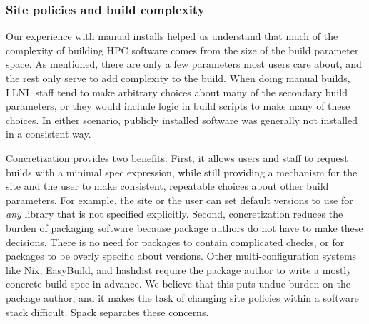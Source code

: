 \subsubsection{Site policies and build complexity}

Our experience with manual installs helped us understand that much of the complexity
of building HPC software comes from the size of the build parameter space.  
As mentioned, there are only a few parameters most users care about, and the rest
only serve to add complexity to the build.  When doing manual builds, LLNL staff
tend to make arbitrary choices about many of the secondary build parameters,
or they would include logic in build scripts to make many of these choices.
In either scenario, publicly installed software was generally not installed
in a consistent way.

Concretization provides two benefits.  First, it allows users and staff to 
request builds with a minimal spec expression, while still providing a
mechanism for the site and the user to make consistent, repeatable choices about
other build parameters.  For example, the site or the user can set default versions
to use for {\it any} library that is not specified explicitly.
%
Second, concretization reduces the burden of packaging software because package authors
do not have to make these decisions.  There is no
need for packages to contain complicated checks, or for packages to be overly
specific about versions.  Other multi-configuration systems like Nix, EasyBuild,
and hashdist require the package author to write a mostly concrete build spec in advance.
We believe that this puts undue burden on the package author, and it makes the task
of changing site policies within a software stack difficult.  Spack
separates these concerns.























